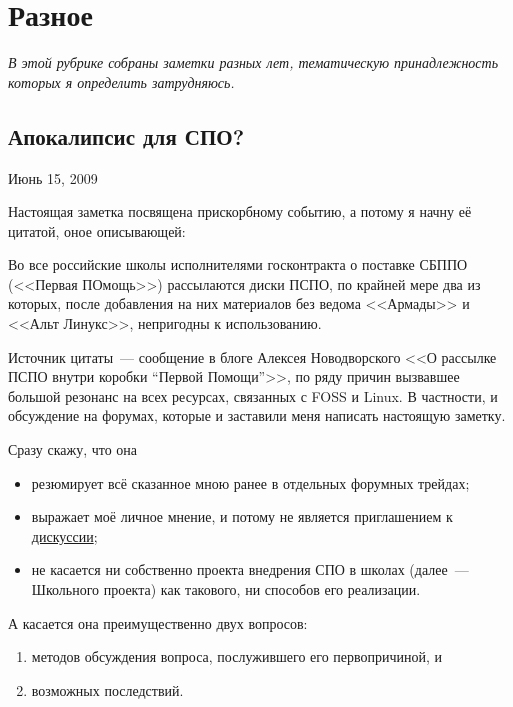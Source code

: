 \chapter{Разное}

\textsl{В этой рубрике собраны заметки разных лет, тематическую принадлежность которых я определить затрудняюсь.}

\section{Апокалипсис для СПО?} 
\begin{timeline}
Июнь 15, 2009
\end{timeline}

Настоящая заметка посвящена прискорбному событию, а потому я начну её цитатой, оное описывающей:

\begin{shadequote}{}
Во все российские школы исполнителями госконтракта о поставке СБППО (<<Первая ПОмощь>>) рассылаются диски ПСПО, по крайней мере два из которых, после добавления на них материалов без ведома <<Армады>> и <<Альт Линукс>>, непригодны к использованию.
\end{shadequote}

Источник цитаты~--- сообщение в блоге Алексея Новодворского <<О рассылке ПСПО внутри коробки ``Первой Помощи''>>, по ряду причин вызвавшее большой резонанс на всех ресурсах, связанных с FOSS и Linux. В частности, и обсуждение на форумах, которые и заставили меня написать настоящую заметку.

Сразу скажу, что она

\begin{itemize}
	\item резюмирует всё сказанное мною ранее в отдельных форумных трейдах; 
	\item выражает моё личное мнение, и потому не является приглашением к \href{http://linuxforum.ru/index.php?showtopic=94518}{дискуссии};
	\item не касается ни собственно проекта внедрения СПО в школах (далее~--- Школьного проекта) как такового, ни способов его реализации. 
\end{itemize}


А касается она преимущественно двух вопросов:

\begin{enumerate}
	\item методов обсуждения вопроса, послужившего его первопричиной, и 
	\item возможных последствий. 
\end{enumerate}

